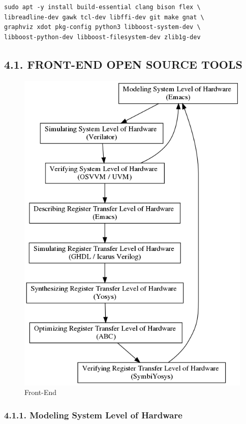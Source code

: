 \documentclass[]{article}
\begin{document}
\begin{verbatim}
sudo apt -y install build-essential clang bison flex \
libreadline-dev gawk tcl-dev libffi-dev git make gnat \
graphviz xdot pkg-config python3 libboost-system-dev \
libboost-python-dev libboost-filesystem-dev zlib1g-dev
\end{verbatim}

\subsection{4.1. FRONT-END OPEN SOURCE
TOOLS}\label{front-end-open-source-tools}

\begin{figure}
\centering
\includegraphics{../doc/front-end.png}
\caption{Front-End}
\end{figure}

\subsubsection{4.1.1. Modeling System Level of
Hardware}\label{modeling-system-level-of-hardware}
\end{document}
